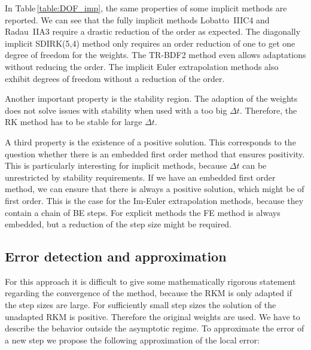 \documentclass[a4paper]{article}
\numberwithin{equation}{section}
\theoremstyle{plain}
\theoremstyle{definition}
\numberwithin{theorem}{section}
\newcommand{\dt}{{\Delta t}}
\newcommand{\1}{\mathbbm{1}}
\begin{document}
In Table\,\ref{table:DOF_imp}, the same properties of some implicit
methods are reported.
We can see that the fully implicit methods Lobatto~IIIC4 and Radau~IIA3 require a drastic reduction of the order as expected.
The diagonally implicit SDIRK(5,4) method only requires an order reduction of one to get one degree of freedom for the weights.
The TR-BDF2 method even allows adaptations without reducing the order.
The implicit Euler extrapolation methods also exhibit degrees of freedom without a reduction of the order.

Another important property is the stability region.
The adaption of the weights does not solve issues with stability when used with a too big $\dt$. Therefore, the RK method has to be stable for large $\dt$.

A third property is the existence of a positive solution. This corresponds to the question whether there is an embedded first order method that ensures positivity. This is particularly interesting for implicit methods, because $\dt$ can be unrestricted by stability requirements.
If we have an embedded first order method, we can ensure that there is always a positive solution, which might be of first order.
This is the case for the Im-Euler extrapolation methods, because they contain a chain of BE steps.
For explicit methods the FE method is always embedded, but a reduction of the step size might be required.

\subsection{Error detection and approximation}\label{sec:error}
For this approach it is difficult to give some mathematically rigorous statement regarding the convergence of the method, because the RKM is only adapted if the step sizes are large.
For sufficiently small step sizes the solution of the unadapted RKM is positive. Therefore the original weights are used.
We have to describe the behavior outside the asymptotic regime.
To approximate the error of a new step we propose the following approximation of the local error:
\end{document}

